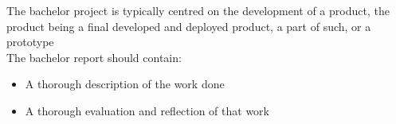 \documentclass[12pt]{article}
\begin{document}
The bachelor project is typically centred on the
development of a product, the product being a
final developed and deployed product, a part of
such, or a prototype\\

The bachelor report should contain:
\begin{itemize}
\item A thorough description of the work done
\item A thorough evaluation and reflection of that work
\end{itemize}



\end{document}
